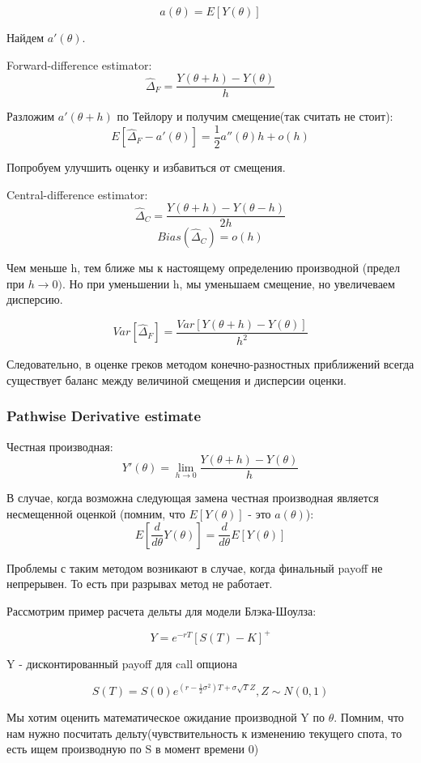 \documentclass{article}
\begin{document}
\[a\left(\theta\right) = E[Y\left(\theta\right)]\]

Найдем $a'(\theta)$.

Forward-difference estimator:
\[\hat{\Delta}_F = \frac{Y\left(\theta + h\right) - Y\left(\theta \right)}{h}\]

Разложим $a'(\theta + h)$ по Тейлору и получим смещение(так считать не стоит):
\[E[\hat{\Delta}_F - a'\left(\theta\right)] = \frac{1}{2}a''\left(\theta\right)h + o(h)\]

Попробуем улучшить оценку и избавиться от смещения.

Central-difference estimator:
\[\hat{\Delta}_C = \frac{Y\left(\theta + h\right) - Y\left(\theta - h\right)}{2h}\]
\[Bias\left(\hat{\Delta}_C\right) = o(h)\]

Чем меньше h, тем ближе мы к настоящему определению производной (предел при \(h \longrightarrow 0)\). Но при уменьшении h, мы уменьшаем смещение, но увеличеваем дисперсию.

\[Var[\hat{\Delta}_F] = \frac{Var[Y\left(\theta + h\right) - Y\left(\theta \right)]}{h^2}\]

Следовательно, в оценке греков методом конечно-разностных приближений всегда существует баланс между величиной смещения и дисперсии оценки.
\subsubsection{Pathwise Derivative estimate}
Честная производная:
\[Y'\left(\theta\right) = \lim\limits_{h\to 0} \frac{Y\left(\theta + h\right) - Y\left(\theta \right)}{h}\]

В случае, когда возможна следующая замена честная производная является несмещенной оценкой (помним, что \(E[Y\left(\theta\right)]\) - это \(a\left(\theta\right)\)):
\[E[\frac{d}{d\theta}Y\left(\theta\right)] = \frac{d}{d\theta}E[Y\left(\theta\right)]\]

Проблемы с таким методом возникают в случае, когда финальный payoff не непрерывен. То есть при разрывах метод не работает.

Рассмотрим пример расчета дельты для модели Блэка-Шоулза:

\[Y = e^{-rT}[S(T)-K]^+\]

Y - дисконтированный payoff для call опциона

\[S(T) = S(0)e^{(r-\frac{1}{2}\sigma^2)T+\sigma\sqrt{T}Z}, Z\sim N(0,1)\]

Мы хотим оценить математическое ожидание производной Y по $\theta$. Помним, что нам нужно посчитать дельту(чувствительность к изменению текущего спота, то есть ищем производную по S в момент времени 0)
\end{document}
